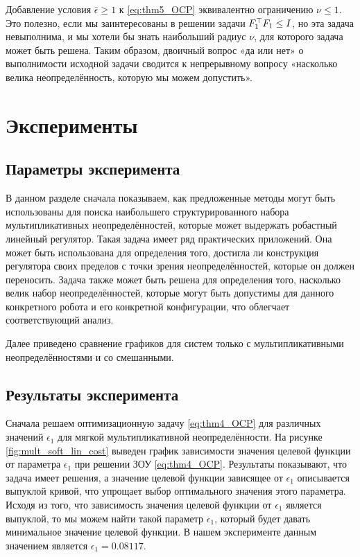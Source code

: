 \begin{remark}
	\label{rm:nu_trick}
	Добавление условия $\bar{\epsilon}\geq 1$ к \eqref{eq:thm5_OCP} эквивалентно ограничению $\nu \leq 1$. Это полезно, если мы заинтересованы в решении задачи ${F}_1^\top{F}_1 \leq {I}$, но эта задача невыполнима, и мы хотели бы знать наибольший радиус $\nu$, для которого задача может быть решена. Таким образом, двоичный вопрос «да или нет» о выполнимости исходной задачи сводится к непрерывному вопросу «насколько велика неопределённость, которую мы можем допустить».
\end{remark}

\section{Эксперименты}\label{sec:ch4/sect3}

\subsection{Параметры эксперимента}\label{sec:ch4/sect3/sub1}

В данном разделе сначала показываем, как предложенные методы могут быть использованы для поиска наибольшего структурированного набора мультипликативных неопределённостей, которые может выдержать робастный линейный регулятор. Такая задача имеет ряд практических приложений. Она может быть использована для определения того, достигла ли конструкция регулятора своих пределов с точки зрения неопределённостей, которые он должен переносить. Задача также может быть решена для определения того, насколько велик набор неопределённостей, которые могут быть допустимы для данного конкретного робота и его конкретной конфигурации, что облегчает соответствующий анализ.

Далее приведено сравнение графиков для систем только с мультипликативными неопределённостями и со смешанными.
\subsection{Результаты эксперимента}\label{sec:ch4/sect3/sub2}

Сначала решаем оптимизационную задачу \eqref{eq:thm4_OCP} для различных значений $\epsilon_1$ для мягкой мультипликативной неопределённости. 
На рисунке \ref{fig:mult_soft_lin_cost} выведен график зависимости значения целевой функции от параметра $\epsilon_1$ при решении ЗОУ \eqref{eq:thm4_OCP}. Результаты показывают, что задача имеет решения, а значение целевой функции зависящее от $\epsilon_1$ описывается выпуклой кривой, что упрощает выбор оптимального значения этого параметра. Исходя из того, что зависимость значения целевой функции от $\epsilon_1$ является выпуклой, то мы можем найти такой параметр $\epsilon_1$, который будет давать минимальное значение целевой функции. В нашем эксперименте данным значением является $\epsilon_1 = 0.08117$.

